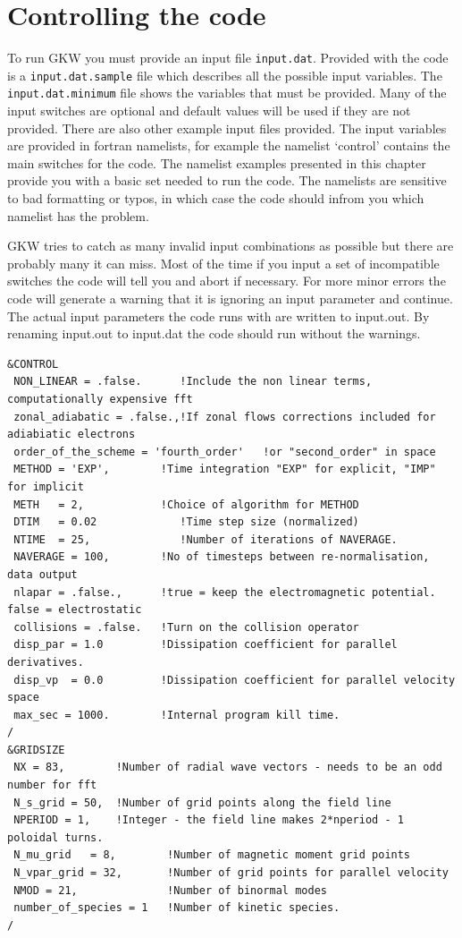 \documentclass{report}
\begin{document}
\section{Controlling the code} %
To run GKW you must provide an input file \texttt{input.dat}. Provided with the code is a \texttt{input.dat.sample} file which describes all the possible input variables.  The \texttt{input.dat.minimum} file shows the variables that must be provided.  Many of the input switches are optional and default values will be used if they are not provided.  There are also other example input files provided.  The input variables are provided in fortran namelists, for example the namelist `control' contains the main switches for the code. The namelist examples presented in this chapter provide you with a basic set needed to run the code.  The namelists are sensitive to bad formatting or typos, in which case the code should infrom you which namelist has the problem.  

GKW tries to catch as many invalid input combinations as possible but there are probably many it can miss.  Most of the time if you input a set of incompatible switches the code will tell you and abort if necessary. For more minor errors the code will generate a warning that it is ignoring an input parameter and continue.  The actual input parameters the code runs with are written to input.out.  By renaming input.out to input.dat the code should run without the warnings.



\begin{footnotesize} \begin{verbatim}
&CONTROL
 NON_LINEAR = .false.      !Include the non linear terms, computationally expensive fft
 zonal_adiabatic = .false.,!If zonal flows corrections included for adiabiatic electrons
 order_of_the_scheme = 'fourth_order'	!or "second_order" in space		
 METHOD = 'EXP',        !Time integration "EXP" for explicit, "IMP" for implicit
 METH   = 2,            !Choice of algorithm for METHOD
 DTIM   = 0.02             !Time step size (normalized)
 NTIME  = 25,              !Number of iterations of NAVERAGE.
 NAVERAGE = 100,        !No of timesteps between re-normalisation, data output
 nlapar = .false.,      !true = keep the electromagnetic potential. false = electrostatic 
 collisions = .false.   !Turn on the collision operator
 disp_par = 1.0	        !Dissipation coefficient for parallel derivatives.
 disp_vp  = 0.0	        !Dissipation coefficient for parallel velocity space
 max_sec = 1000.        !Internal program kill time.
/
&GRIDSIZE
 NX = 83,        !Number of radial wave vectors - needs to be an odd number for fft
 N_s_grid = 50,  !Number of grid points along the field line 
 NPERIOD = 1,    !Integer - the field line makes 2*nperiod - 1 poloidal turns. 
 N_mu_grid   = 8,        !Number of magnetic moment grid points
 N_vpar_grid = 32,       !Number of grid points for parallel velocity 
 NMOD = 21,              !Number of binormal modes
 number_of_species = 1 	 !Number of kinetic species. 
/
\end{verbatim}\end{footnotesize}
\end{document}
